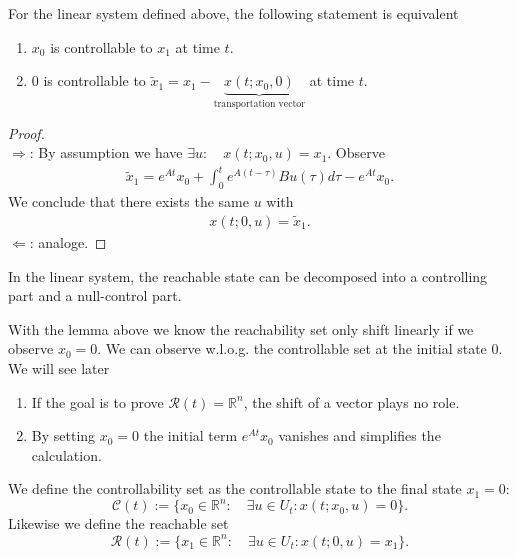 \begin{lemma}
	For the linear system defined above, the following statement is equivalent 
	\begin{enumerate}
		\item $x_0$ is controllable to $x_1$ at time $t$. 
		\item $0$ is controllable to $\tilde{x}_1 = x_1 - \underbrace{ x(t; x_0, 0)}_{\text{transportation vector}}$ at time $t$.
	\end{enumerate}
\end{lemma}
\begin{proof}
\quad\\
$\Rightarrow$: By assumption we have $\exists u : \quad x(t; x_0, u) = x_1$. Observe
\begin{align*}
	\tilde{x}_1 = e^{At }x_0 + \int_0^t e^{A(t - \tau)} Bu (\tau) d\tau - e^{At}x_0.
\end{align*}
We conclude that there exists the same $u$ with 
\begin{align*}
	x(t; 0, u) = \tilde{x}_1. 
\end{align*}
$\Leftarrow$: analoge. 
\end{proof}

\begin{remark}
In the linear system, the reachable state can be decomposed into a controlling part and a null-control part. 	
\end{remark}


With the lemma above we know the reachability set only shift linearly if we observe $x_0 =0$. We can observe w.l.o.g. the controllable set at the initial state $0$. We will see later
\begin{enumerate}
	\item If the goal is to prove $\mathcal{R}(t) = \mathbb{R}^n$, the shift of a vector plays no role. 
	\item By setting $x_0 = 0$ the initial term $e^{At} x_0$ vanishes and simplifies the calculation. 
\end{enumerate}


\begin{definition}
We define the controllability set as the controllable state to the final state $x_1 = 0$:
\begin{equation}
	\mathcal{C}(t) := \{x_0 \in \mathbb{R}^n: \quad \exists u \in U_t: x(t; x_0, u) = 0 \}.
\end{equation}
Likewise we define the reachable set
\begin{equation}
	\mathcal{R}(t):= \{x_1 \in \mathbb{R}^n: \quad \exists u \in U_t: x(t; 0, u) = x_1 \}. 
\end{equation}
\end{definition}

